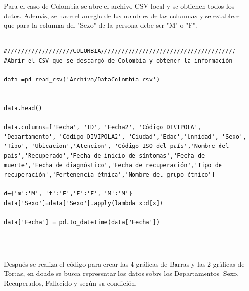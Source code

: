 \documentclass[conference,compsoc,onecolumn]{IEEEtran}
\begin{document}
Para el caso de Colombia  se abre el archivo CSV local y se obtienen todos los datos. Además, se hace el arreglo de los nombres de las columnas y se establece que para la columna del "Sexo" de la persona debe ser "M" o "F".
\\\
\begin{lstlisting}
#///////////////////COLOMBIA///////////////////////////////////////
#Abrir el CSV que se descargó de Colombia y obtener la información

data =pd.read_csv('Archivo/DataColombia.csv')


data.head()

data.columns=['Fecha', 'ID', 'Fecha2', 'Código DIVIPOLA', 'Departamento', 'Código DIVIPOLA2', 'Ciudad','Edad','Unnidad', 'Sexo', 'Tipo', 'Ubicacion','Atencion', 'Código ISO del país','Nombre del país','Recuperado','Fecha de inicio de síntomas','Fecha de muerte','Fecha de diagnóstico','Fecha de recuperación','Tipo de recuperación','Pertenencia étnica','Nombre del grupo étnico']

d={'m':'M', 'f':'F','F':'F', 'M':'M'}
data['Sexo']=data['Sexo'].apply(lambda x:d[x])

data['Fecha'] = pd.to_datetime(data['Fecha'])
\end{lstlisting}
\\\

Después se realiza el código para crear las 4 gráficas de Barras y las 2 gráficas de Tortas, en donde se busca representar los datos sobre los Departamentos, Sexo, Recuperados, Fallecido y según su condición.
\\\
\end{document}
